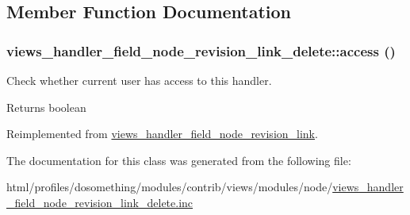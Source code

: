 \subsection{Member Function Documentation}
\hypertarget{classviews__handler__field__node__revision__link__delete_a8d1e660c4945e837ced26d6f12a6521e}{
\subsubsection[{access}]{\setlength{\rightskip}{0pt plus 5cm}views\_\-handler\_\-field\_\-node\_\-revision\_\-link\_\-delete::access ()}}
\label{classviews__handler__field__node__revision__link__delete_a8d1e660c4945e837ced26d6f12a6521e}
Check whether current user has access to this handler.

\begin{DoxyReturn}{Returns}
boolean 
\end{DoxyReturn}


Reimplemented from \hyperlink{classviews__handler__field__node__revision__link_a29923ca97bbff1c87c0e9338ec972a07}{views\_\-handler\_\-field\_\-node\_\-revision\_\-link}.

The documentation for this class was generated from the following file:\begin{DoxyCompactItemize}
\item 
html/profiles/dosomething/modules/contrib/views/modules/node/\hyperlink{views__handler__field__node__revision__link__delete_8inc}{views\_\-handler\_\-field\_\-node\_\-revision\_\-link\_\-delete.inc}\end{DoxyCompactItemize}
